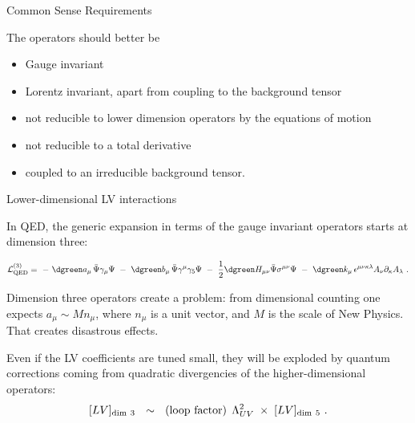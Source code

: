 \documentclass[pdf,UofT06talk,slideColor,colorBG,accumulate]{prosper}
\begin{document}
\begin{slide}{Common Sense Requirements}

	The operators should better be 
\begin{itemize}
	\item Gauge invariant
	\item Lorentz invariant, apart from coupling to the background tensor
	\item not reducible to lower dimension operators by the equations
		of motion
	\item not reducible to a total derivative
	\item coupled to an irreducible background tensor.
\end{itemize}

\end{slide}


\begin{slide}{Lower-dimensional LV interactions}

	In QED, the generic expansion in terms of the gauge invariant 
	operators starts at dimension {\red three}:

{
\mathcolor
\[
\nonumber
{\cal L}_{\rm QED}^{(3)} =
~-~{\dgreen a_\mu}\,  \bar \Psi \gamma_\mu \Psi
~-~ {\dgreen b_\mu}\,  \bar \Psi \gamma^\mu \gamma_5 \Psi 
~-~ \frac{1}{2}{\dgreen H_{\mu\nu}}\bar \Psi \sigma^{\mu\nu} \Psi
~-~ {\dgreen k_\mu}\,  
\epsilon^{\mu\nu\kappa\lambda} A_\nu \partial_\kappa A_\lambda~.
\]
}

	Dimension three operators create a problem:
	from dimensional counting one expects 
	{\blue $ a_\mu \sim M n_\mu $}, 
	where {\blue $ n_\mu $} is a unit vector, and
	$ M $ is the scale of New Physics.
	That creates {\myit\blue disastrous} effects.

	Even if the LV coefficients are tuned small, they will be 
	exploded by quantum corrections coming from quadratic divergencies
	of the higher-dimensional operators:
{
\mathcolor
\[
[LV]_{\rm dim~3} ~~\sim~~ ({\rm loop~factor}) \, 
\;\Lambda_{UV}^2\;
\times\; [LV]_{{\rm dim}~5}~. 
\]
}

\end{slide}
\end{document}
